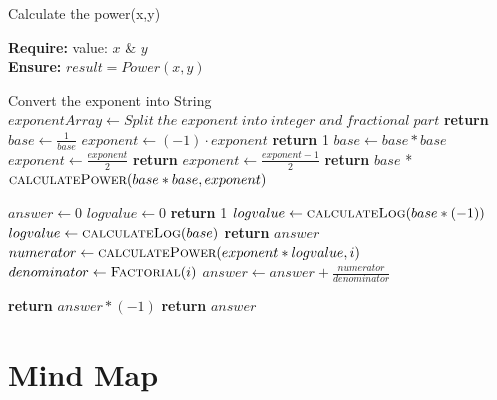 \documentclass[a4paper, 12pt]{article}
\begin{document}
\begin{algorithm}
\caption{Calculate the power(x,y)}

\textbf{Require:}  value: $x$ \& $y$  \\
\textbf{Ensure:} $result = Power(x,y)$
\begin{algorithmic}[1]

    \State Convert the exponent into String
    \State $exponentArray \leftarrow Split\;the\;exponent\;into\;integer\;and\;fractional\;part$
    \State \textbf{return} 
    \EndIf
    \State $base \leftarrow \frac{1}{base}$
    \State $exponent \leftarrow (-1) \cdot exponent$
    \EndIf
    \State \textbf{return} 1
    \EndIf
    \State $base \leftarrow base * base$
    \State $exponent \leftarrow \frac{exponent}{2}$
    \State \textbf{return} 
    \Else
    \State $exponent \leftarrow \frac{exponent-1}{2}$
    \State \textbf{return} $base$ * $\Call{calculatePower}{base*base,exponent}$
    \EndIf
    \EndProcedure
\Statex


    \State $answer \leftarrow 0$
    \State $logvalue \leftarrow 0$
    \State \textbf{return} 1
    \EndIf
    \State $logvalue \leftarrow \Call{calculateLog}{base * (-1)}$
    \Else
    \State $logvalue \leftarrow \Call{calculateLog}{base}$
    \EndIf
    \State \textbf{return} $answer$
    \EndIf
    \State $numerator \leftarrow \Call{calculatePower}{exponent*logvalue,i}$
    \State $denominator \leftarrow \Call{Factorial}{i}$
    \State $answer \leftarrow answer + \frac{numerator}{denominator}$
    \EndFor
    
    \State \textbf{return} $answer * (-1)$
    \Else
    \State \textbf{return} $answer$
    \EndIf
    \EndProcedure
\Statex

\end{algorithmic}
\end{algorithm}

\newpage

\section{Mind Map}
\end{document}
